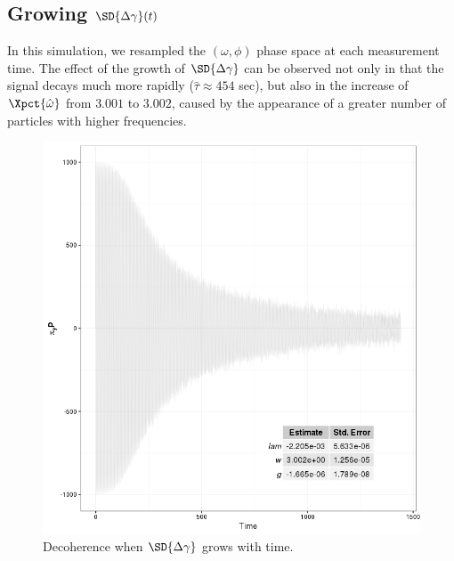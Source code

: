 \documentclass{article}
\begin{document}
\subsection{Growing $\SD{\dy}(t)$}
In this simulation, we resampled the $(\omega,\phi)$ phase space at each measurement time. The effect of the growth of $\SD{\dy}$ can be observed not only in that the signal decays much more rapidly ($\hat{\tau}\approx 454$ sec), but also in the increase of $\Xpct{\hat{\omega}}$ from $3.001$ to $3.002$, caused by the appearance of a greater number of particles with higher frequencies.
\begin{figure}[h]
	\centering
	\includegraphics[scale=.6]{../img/Signal_Growing_Dgamma}
	\caption{Decoherence when $\SD{\dy}$ grows with time.}
\end{figure}
\end{document}
